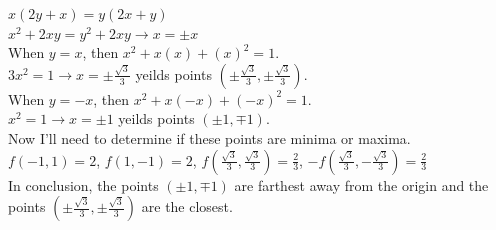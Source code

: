 \documentclass[12pt]{article}
\begin{document}
\noindent $x(2y+x) = y(2x+y)$\\
\noindent $x^{2} + 2xy  = y^{2}+ 2xy \rightarrow x = \pm x$\\
\noindent When $y = x$, then $x^{2} + x(x) + (x)^{2} = 1$.\\
\noindent $3x^{2} = 1 \rightarrow x = \pm \frac{\sqrt{3}}{3}$ yeilds points $(\pm \frac{\sqrt{3}}{3}, \pm \frac{\sqrt{3}}{3})$.\\
\noindent When $y =-x$, then $x^{2} + x(-x) + (-x)^{2} = 1$.\\
\noindent $x^{2} = 1 \rightarrow x = \pm 1$ yeilds points $(\pm 1, \mp 1)$.\\
\noindent Now I'll need to determine if these points are minima or maxima.\\
\noindent $f(-1, 1) = 2$, \hspace{10pt} $f(1, -1) = 2$, \hspace{10pt} $f(\frac{\sqrt{3}}{3}, \frac{\sqrt{3}}{3}) = \frac{2}{3}$, \hspace{10pt} $-f(\frac{\sqrt{3}}{3}, -\frac{\sqrt{3}}{3}) = \frac{2}{3}$\\
\noindent In conclusion, the points  $(\pm 1, \mp 1)$ are farthest away from the origin and the points $(\pm \frac{\sqrt{3}}{3}, \pm \frac{\sqrt{3}}{3})$ are the closest.\\\\
\end{document}
